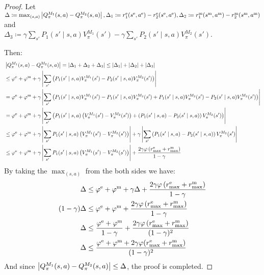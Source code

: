 %
\begin{proof}
Let \\
%
$\Delta \coloneqq \max_{(s, a)}\abs{Q^{M_1}_\pi(s, a) - Q^{M_2}_\pi(s, a)}, \\
%
\Delta_1 \coloneqq \env{r}_1(\env{s}, \env{a}) - \env{r}_2(\env{s}, \env{a}), \\
%
\Delta_2 \coloneqq \mon{r}_1(\mon{s}, \mon{a}) - \mon{r}_2(\mon{s}, \mon{a})$ and \\
%
$\Delta_3 \coloneqq \gamma\sum_{s'}P_1(s' \mid s, a)V^{M_1}_\pi(s') - \gamma\sum_{s'}P_2(s' \mid s, a)V^{M_2}_\pi(s')$.
%

Then:
%
    \begin{align*}
       & \left \lvert Q^{M_1}_\pi(s, a) - Q^{M_2}_\pi(s, a) \right \rvert = \left \lvert \Delta_1 + \Delta_2 + \Delta_3 \right \rvert 
        \leq \left \lvert \Delta_1 \right \rvert + \left \lvert \Delta_2 \right \rvert + \left \lvert \Delta_3 \right \rvert \\
       & \leq \varphi^\text{e} + \varphi^\text{m} + \gamma \left \lvert \sum_{s'}\left(P_1(s' \mid s, a)V^{M_1}_\pi(s') - P_2(s' \mid s, a)V^{M_2}_\pi(s')\right) \right \rvert \\
       & = \varphi^\text{e} + \varphi^\text{m} + \gamma \left \lvert \sum_{s'}\left(P_1(s' \mid s, a)V^{M_1}_\pi(s') - P_1(s' \mid s, a)V^{M_2}_\pi(s')+ P_1(s' \mid s, a)V^{M_2}_\pi(s') - P_2(s' \mid s, a)V^{M_2}_\pi(s')\right) \right \rvert \\
       & = \varphi^\text{e} + \varphi^\text{m} + \gamma \left \lvert \sum_{s'}\left(P_1(s' \mid s, a)\left(V^{M_1}_\pi(s') - V^{M_2}_\pi(s')\right)+ \left(P_1(s' \mid s, a) - P_2(s' \mid s, a)\right)V^{M_2}_\pi(s')\right) \right \rvert \\
       & \leq \varphi^\text{e} + \varphi^\text{m} + \gamma \left \lvert \sum_{s'}P_1(s' \mid s, a)\left(V^{M_1}_\pi(s') - V^{M_2}_\pi(s')\right)  \right \rvert+ \gamma\left \lvert \sum_{s'}\left(P_1(s' \mid s, a) - P_2(s' \mid s, a)\right)V^{M_2}_\pi(s') \right \rvert \\
       & \leq \varphi^\text{e} + \varphi^\text{m} + \gamma \left \lvert \sum_{s'}P_1(s' \mid s, a)\left(V^{M_1}_\pi(s') - V^{M_2}_\pi(s')\right)  \right \rvert + \frac{2\gamma\varphi\left(r_{\text{max}}^\text{e} + r_{\text{max}}^\text{m} \right)}{1 - \gamma}
    \end{align*}
    By taking the $\max_{(s, a)}$ from the both sides we have:
    \begin{align*}
        \Delta & \leq \varphi^\text{e} + \varphi^\text{m} + \gamma \Delta + \frac{2\gamma\varphi\left(r_{\text{max}}^\text{e} + r_{\text{max}}^\text{m} \right)}{1 - \gamma} \\
        (1 - \gamma) \Delta & \leq \varphi^\text{e} + \varphi^\text{m} + \frac{2\gamma\varphi\left(r_{\text{max}}^\text{e} + r_{\text{max}}^\text{m} \right)}{1 - \gamma} \\
        \Delta & \leq \frac{\varphi^\text{e} + \varphi^\text{m}}{1 - \gamma} + \frac{2\gamma\varphi\left(r_{\text{max}}^\text{e} + r_{\text{max}}^\text{m} \right)}{(1 - \gamma)^2} \\
        \Delta & \leq \frac{\varphi^\text{e} + \varphi^\text{m} + 2\gamma\varphi(r_{\text{max}}^\text{e} + r_{\text{max}}^\text{m})}{(1 - \gamma)^2}
    \end{align*}
    And since $\left \lvert Q^{M_1}_\pi(s, a) - Q^{M_2}_\pi(s, a) \right \rvert \leq \Delta$, the proof is completed. \qedhere
\end{proof}
